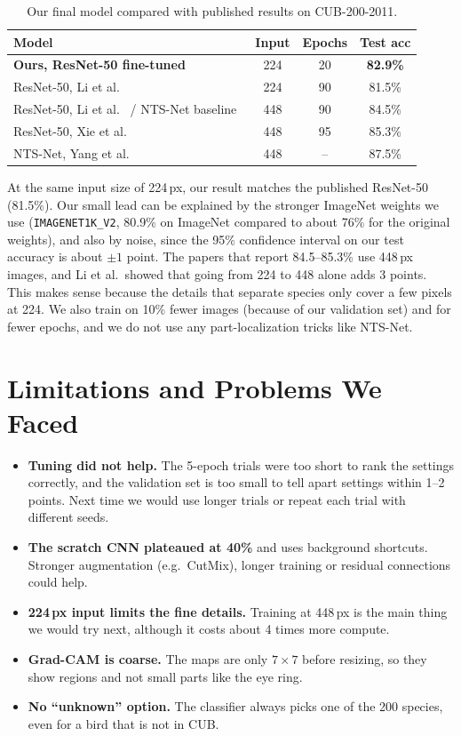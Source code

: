 \documentclass[11pt,a4paper]{article}
\newcommand{\code}[1]{\texttt{\small #1}}
\begin{document}
\begin{table}[H]
\centering
\small
\begin{tabular}{l c c c}
\toprule
\textbf{Model} & \textbf{Input} & \textbf{Epochs} & \textbf{Test acc} \\
\midrule
\textbf{Ours, ResNet-50 fine-tuned} & 224 & 20 & \textbf{82.9\%} \\
ResNet-50, Li et al.~\cite{li2017dtram} & 224 & 90 & 81.5\% \\
ResNet-50, Li et al.~\cite{li2017dtram} / NTS-Net baseline~\cite{yang2018nts} & 448 & 90 & 84.5\% \\
ResNet-50, Xie et al.~\cite{xie2021cutthumbnail} & 448 & 95 & 85.3\% \\
NTS-Net, Yang et al.~\cite{yang2018nts} & 448 & -- & 87.5\% \\
\bottomrule
\end{tabular}
\caption{Our final model compared with published results on CUB-200-2011.}
\label{tab:benchmark}
\end{table}

At the same input size of 224\,px, our result matches the published ResNet-50 (81.5\%). Our small lead can be explained by the stronger ImageNet weights we use (\code{IMAGENET1K\_V2}, 80.9\% on ImageNet compared to about 76\% for the original weights), and also by noise, since the 95\% confidence interval on our test accuracy is about $\pm1$ point. The papers that report 84.5--85.3\% use 448\,px images, and Li et al.\ showed that going from 224 to 448 alone adds 3 points. This makes sense because the details that separate species only cover a few pixels at 224. We also train on 10\% fewer images (because of our validation set) and for fewer epochs, and we do not use any part-localization tricks like NTS-Net.

\section{Limitations and Problems We Faced}

\begin{itemize}
  \item \textbf{Tuning did not help.} The 5-epoch trials were too short to rank the settings correctly, and the validation set is too small to tell apart settings within 1--2 points. Next time we would use longer trials or repeat each trial with different seeds.
  \item \textbf{The scratch CNN plateaued at 40\%} and uses background shortcuts. Stronger augmentation (e.g.\ CutMix), longer training or residual connections could help.
  \item \textbf{224\,px input limits the fine details.} Training at 448\,px is the main thing we would try next, although it costs about 4 times more compute.
  \item \textbf{Grad-CAM is coarse.} The maps are only $7\times7$ before resizing, so they show regions and not small parts like the eye ring.
  \item \textbf{No ``unknown'' option.} The classifier always picks one of the 200 species, even for a bird that is not in CUB.
\end{itemize}
\end{document}
